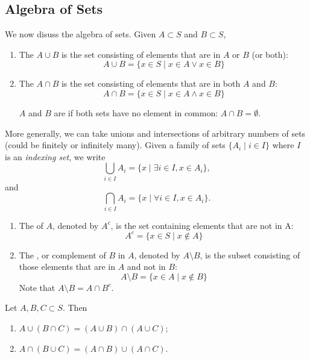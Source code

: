 \subsection{Algebra of Sets}
We now disuss the algebra of sets. Given $A \subset S$ and $B \subset S$,
\begin{enumerate}[label=(\roman*)]
\item The  $A \cup B$ is the set consisting of elements that are in $A$ or $B$ (or both):
\[ A\cup B=\{x \in S \mid x\in A \lor x\in B\} \]

\item The  $A \cap B$ is the set consisting of elements that are in both $A$ and $B$:
\[ A\cap B=\{x \in S \mid x\in A \land x\in B\} \]

$A$ and $B$ are  if both sets have no element in common: $A\cap B=\emptyset$.
\end{enumerate}

More generally, we can take unions and intersections of arbitrary numbers of sets (could be finitely or infinitely many). Given a family of sets $\{A_i\mid i\in I\}$ where $I$ is an \emph{indexing set}, we write
\[\bigcup_{i\in I}A_i=\{x \mid \exists i\in I, x\in A_i\},\]
and
\[\bigcap_{i\in I}A_i=\{x \mid \forall i\in I, x\in A_i\}.\]

\begin{enumerate}[resume*]
\item The  of $A$, denoted by $A^c$, is the set containing elements that are not in A:
\[ A^c = \{x \in S \mid x \notin A\} \]

\item The , or complement of $B$ in $A$, denoted by $A\setminus B$, is the subset consisting of those elements that are in $A$ and not in $B$:
\[ A\setminus B = \{x \in A \mid x \notin B\} \]
Note that $A\setminus B = A \cap B^c$.
\end{enumerate}

\begin{proposition}
Let $A,B,C\subset S$. Then
\begin{enumerate}[label=(\roman*)]
\item $A\cup(B\cap C)=(A\cup B)\cap(A\cup C)$;
\item $A\cap(B\cup C)=(A\cap B)\cup(A\cap C)$.
\end{enumerate}
\end{proposition}

